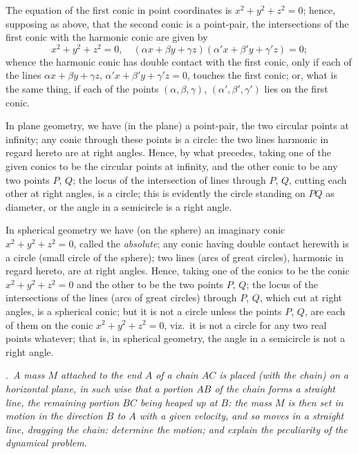 \documentclass[11pt,a4paper]{article}
\theoremstyle{plain}
\theoremstyle{definition}
\begin{document}
The equation of the first conic in point coordinates is $x^2 + y^2 + z^2 = 0$; hence,
supposing as above, that the second conic is a point-pair, the intersections of the first
conic with the harmonic conic are given by
\[
x^2 + y^2 + z^2 = 0, \quad (\alpha x + \beta y + \gamma z)(\alpha' x + \beta' y + \gamma' z) = 0;
\]
whence the harmonic conic has double contact with the first conic, only if each of
the lines $\alpha x + \beta y + \gamma z$, $\alpha' x + \beta' y + \gamma' z = 0$, touches the first conic; or, what is the same
thing, if each of the points $(\alpha, \beta, \gamma)$, $(\alpha', \beta', \gamma')$ lies on the first conic.

In plane geometry, we have (in the plane) a point-pair, the two circular points
at infinity; any conic through these points is a circle: the two lines harmonic in
regard hereto are at right angles. Hence, by what precedes, taking one of the given
conics to be the circular points at infinity, and the other conic to be any two points
$P$, $Q$; the locus of the intersection of lines through $P$, $Q$, cutting each other at right
angles, is a circle; this is evidently the circle standing on $PQ$ as diameter, or the
angle in a semicircle is a right angle.

In spherical geometry we have (on the sphere) an imaginary conic $x^2 + y^2 + z^2 = 0$,
called the \textit{absolute}; any conic having double contact herewith is a circle (small circle
of the sphere); two lines (arcs of great circles), harmonic in regard hereto, are at right
angles. Hence, taking one of the conics to be the conic $x^2 + y^2 + z^2 = 0$ and the other
to be the two points $P$, $Q$; the locus of the intersections of the lines (arcs of great
circles) through $P$, $Q$, which cut at right angles, is a spherical conic; but it is not a
circle unless the points $P$, $Q$, are each of them on the conic $x^2 + y^2 + z^2 = 0$, viz.\ it is
not a circle for any two real points whatever; that is, in spherical geometry, the
angle in a semicircle is not a right angle.

\medskip
{}.\ \textit{A mass $M$ attached to the end $A$ of a chain $AC$ is placed (with the chain)
on a horizontal plane, in such wise that a portion $AB$ of the chain forms a straight
line, the remaining portion $BC$ being heaped up at $B$: the mass $M$ is then set in
motion in the direction $B$ to $A$ with a given velocity, and so moves in a straight line,
dragging the chain: determine the motion; and explain the peculiarity of the dynamical
problem.}
\end{document}
